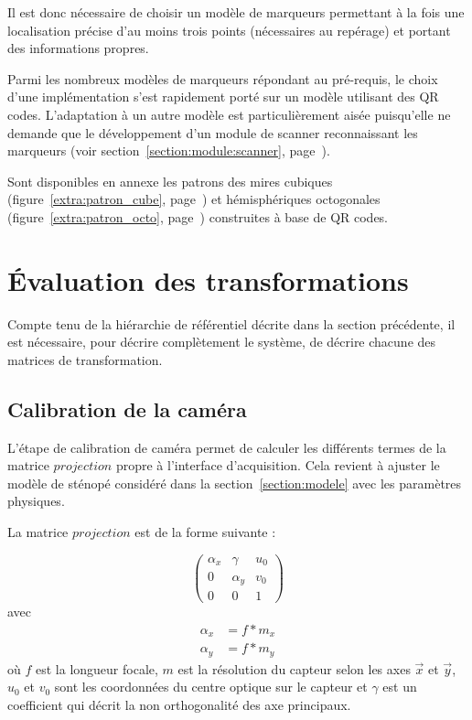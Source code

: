 \documentclass[10pt,a4paper,twoside, twocolumn]{report}
\begin{document}
Il est donc nécessaire de choisir un modèle de marqueurs permettant à la fois une localisation précise d'au moins trois points (nécessaires au repérage) et portant des informations propres.

Parmi les nombreux modèles de marqueurs répondant au pré-requis, le choix d'une implémentation s'est rapidement porté sur un modèle utilisant des QR codes. L'adaptation à un autre modèle est particulièrement aisée puisqu'elle ne demande que le développement d'un module de scanner reconnaissant les marqueurs (voir section~\ref{section:module:scanner}, page~\pageref{section:module:scanner}).

Sont disponibles en annexe les patrons des mires cubiques (figure~\ref{extra:patron_cube}, page~\pageref{extra:patron_cube}) et hémisphériques octogonales (figure~\ref{extra:patron_octo}, page~\pageref{extra:patron_octo}) construites à base de QR codes.



\section{Évaluation des transformations}

Compte tenu de la hiérarchie de référentiel décrite dans la section précédente, il est nécessaire, pour décrire complètement le système, de décrire chacune des matrices de transformation. 


\subsection{Calibration de la caméra}

L'étape de calibration de caméra permet de calculer les différents termes de la matrice $projection$ propre à l'interface d'acquisition. Cela revient à ajuster le modèle de sténopé considéré dans la section~\ref{section:modele} avec les paramètres physiques.

La matrice $projection$ est de la forme suivante :

\begin{equation}
	\begin{pmatrix}
		\alpha_x	&	\gamma		& u_0	\\
		0					&	\alpha_y	&	v_0	\\
		0					&	0					&	1
	\end{pmatrix}
\end{equation}
avec 
\begin{align*}
	\alpha_x	&= f * m_x	\\
	\alpha_y	&= f * m_y
\end{align*}
où $f$ est la longueur focale, $m$ est la résolution du capteur selon les axes $\vec x$ et $\vec y$, $u_0$ et $v_0$ sont les coordonnées du centre optique sur le capteur et $\gamma$ est un coefficient qui décrit la non orthogonalité des axe principaux.
\end{document}
